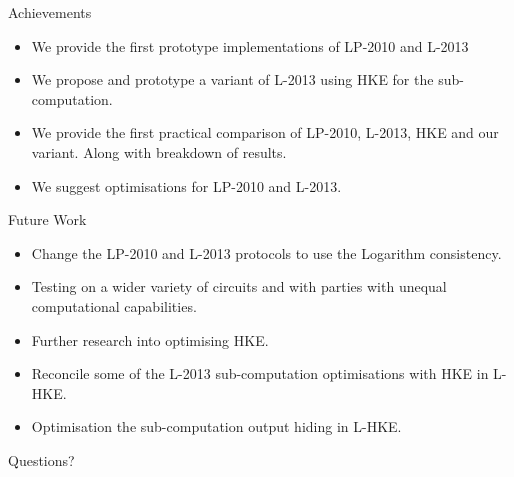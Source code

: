\documentclass[t, 12pt]{beamer}            %
\begin{document}
\begin{frame}{Achievements}
	\begin{itemize} %
		\item We provide the first prototype implementations of LP-2010 and L-2013
		\item We propose and prototype a variant of L-2013 using HKE for the sub-computation.
		\item We provide the first practical comparison of LP-2010, L-2013, HKE and our variant. Along with breakdown of results.
		\item We suggest optimisations for LP-2010 and L-2013.
		
	\end{itemize}
\end{frame}


\begin{frame}{Future Work}
	\begin{itemize} %
		\item Change the LP-2010 and L-2013  protocols to use the Logarithm consistency.
		\item Testing on a wider variety of circuits and with parties with unequal computational capabilities.
		\item Further research into optimising HKE.
		\item Reconcile some of the L-2013 sub-computation optimisations with HKE in L-HKE.
		\item Optimisation the sub-computation output hiding in L-HKE.
		
	\end{itemize}
\end{frame}


\begin{frame}
	\vspace{2.5cm}
	\begin{center}
		\textcolor{bristolred}{\Huge Questions?}
	\end{center}
\end{frame}
\end{document}
